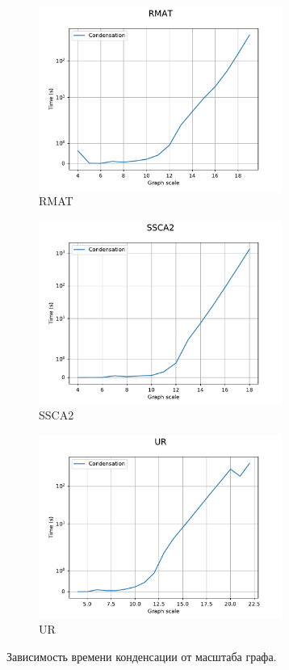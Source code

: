 \documentclass[12pt,a4paper,oneside,openany]{article}
\theoremstyle{definition}
\theoremstyle{lemma}
\theoremstyle{remark}
\begin{document}
\begin{figure}[H]
    \begin{subfigure}{.5\textwidth}
      \centering
      \includegraphics[width=8cm]{images/condensation_RMAT.pdf}
      \caption{RMAT}
      \label{fig:condensation:rmat}
    \end{subfigure}
    \begin{subfigure}{.5\textwidth}
      \centering
      \includegraphics[width=8cm]{images/condensation_SSCA2.pdf}
      \caption{SSCA2}
      \label{fig:condensation:ssca}
    \end{subfigure}
    \begin{subfigure}{.5\textwidth}
      \centering
      \includegraphics[width=8cm]{images/condensation_UR.pdf}
      \caption{UR}
      \label{fig:condensation:ur}
    \end{subfigure}
    \caption{Зависимость времени конденсации от масштаба графа.}
    \label{fig:condensation}
\end{figure}
\end{document}
